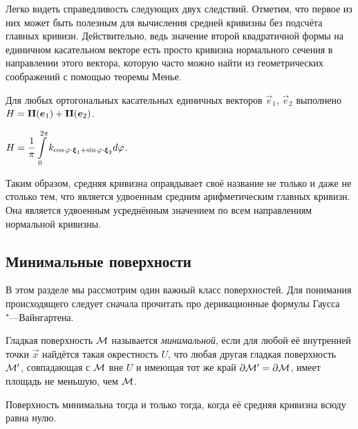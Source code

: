 Легко видеть справедливость следующих двух следствий. Отметим, что первое из них может быть полезным для вычисления средней кривизны без подсчёта главных кривизн. Действительно, ведь значение второй квадратичной формы на единичном касательном векторе есть просто кривизна нормального сечения в направлении этого вектора, которую часто можно найти из геометрических соображений с помощью теоремы Менье.

\begin{corollary}
	Для любых ортогональных касательных единичных векторов $\vec{e}_1$, $\vec{e}_2$ выполнено $H = \boldsymbol{\operatorname{II}}(\boldsymbol{e}_1) + \boldsymbol{\operatorname{II}}(\boldsymbol{e}_2)$.
\end{corollary}

\begin{corollary}
	$\displaystyle H = \frac{1}{\pi}\int\limits_0^{2\pi}k_{\cos\varphi \cdot \boldsymbol{\xi}_1 + \sin\varphi \cdot \boldsymbol{\xi}_2}d\varphi$.
\end{corollary}

Таким образом, средняя кривизна оправдывает своё название не только и даже не столько тем, что является удвоенным средним арифметическим главных кривизн. Она является удвоенным усреднённым значением по всем направлениям нормальной кривизны.

\subsection{Минимальные поверхности}

В этом разделе мы рассмотрим один важный класс поверхностей. Для понимания происходящего следует сначала прочитать про деривационные формулы Гаусса "---Вайнгартена.

\begin{definition}
	Гладкая поверхность $\mathcal{M}$ называется \textit{минимальной}, если для любой её внутренней точки $\vec{x}$ найдётся такая окрестность $U$, что любая другая гладкая поверхность $\mathcal{M}^\prime$, совпадающая с $\mathcal{M}$ вне $U$ и имеющая тот же край $\partial\mathcal{M}^\prime = \partial\mathcal{M}$, имеет площадь не меньшую, чем $\mathcal{M}$.
\end{definition}

\begin{theorem}
	Поверхность минимальна тогда и только тогда, когда её средняя кривизна всюду равна нулю.
\end{theorem}

